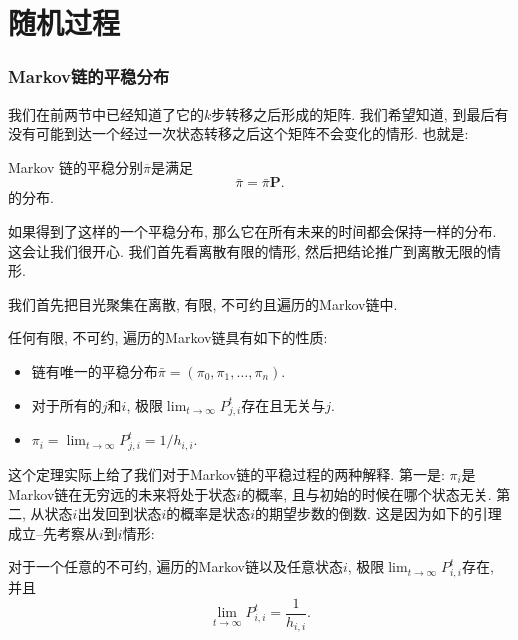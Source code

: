 \part{随机过程}







\section{Markov链的平稳分布}

我们在前两节中已经知道了它的$k$步转移之后形成的矩阵. 我们希望知道, 到最后有没有可能到达一个经过一次状态转移之后这个矩阵不会变化的情形. 也就是: 

\begin{definition}
    Markov 链的平稳分别$\overline \pi$是满足
    $$
    \bar{\pi}=\bar{\pi} \mathbf{P} .
    $$
    的分布. 
\end{definition}

如果得到了这样的一个平稳分布, 那么它在所有未来的时间都会保持一样的分布. 这会让我们很开心. 我们首先看离散有限的情形, 然后把结论推广到离散无限的情形. 

我们首先把目光聚集在离散, 有限, 不可约且遍历的Markov链中. 

\begin{theorem}
    任何有限, 不可约, 遍历的Markov链具有如下的性质: 
    \begin{itemize}
        \item 链有唯一的平稳分布$\bar{\pi}=\left(\pi_0, \pi_1, \ldots, \pi_n\right)$.
        \item 对于所有的$j$和$i$, 极限$\lim _{t \rightarrow \infty} P_{j, i}^t$存在且无关与$j$. 
        \item $\pi_i=\lim _{t \rightarrow \infty} P_{j, i}^t=1 / h_{i, i}$.
    \end{itemize}
\end{theorem}

这个定理实际上给了我们对于Markov链的平稳过程的两种解释. 第一是: $\pi_i$是Markov链在无穷远的未来将处于状态$i$的概率, 且与初始的时候在哪个状态无关. 第二, 从状态$i$出发回到状态$i$的概率是状态$i$的期望步数的倒数. 这是因为如下的引理成立--先考察从$i$到$i$情形: 

\begin{lemma}
    对于一个任意的不可约, 遍历的Markov链以及任意状态$i$, 极限$\lim _{t \rightarrow \infty} P_{i, i}^t$存在, 并且
    $$\lim _{t \rightarrow \infty} P_{i, i}^t=\frac{1}{h_{i, i}}.$$
\end{lemma}

